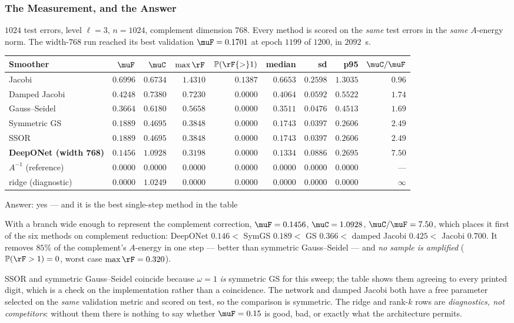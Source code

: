 \frametitle{The Measurement, and the Answer}
\footnotesize

$1024$ test errors, level $\ell=3$, $n=1024$, complement dimension $768$. Every method is
scored on the \emph{same} test errors in the \emph{same} $A$-energy norm. The width-$768$
run reached its best validation $\muF=0.1701$ at epoch $1199$ of $1200$, in $2092$~s.

\vspace{1mm}
\centering
{\scriptsize
\begin{tabular}{@{}lrrrrrrrr@{}}
\toprule
Smoother & $\muF$ & $\muC$ & $\max\rF$ & $\mathbb{P}(\rF{>}1)$ &
median & sd & p95 & $\muC/\muF$ \\
\midrule
Jacobi & $0.6996$ & $0.6734$ & $1.4310$ & $0.1387$ & $0.6653$ & $0.2598$ & $1.3035$ & $0.96$ \\
Damped Jacobi & $0.4248$ & $0.7380$ & $0.7230$ & $0.0000$ & $0.4064$ & $0.0592$ & $0.5522$ & $1.74$ \\
Gauss--Seidel & $0.3664$ & $0.6180$ & $0.5658$ & $0.0000$ & $0.3511$ & $0.0476$ & $0.4513$ & $1.69$ \\
Symmetric GS & $0.1889$ & $0.4695$ & $0.3848$ & $0.0000$ & $0.1743$ & $0.0397$ & $0.2606$ & $2.49$ \\
SSOR & $0.1889$ & $0.4695$ & $0.3848$ & $0.0000$ & $0.1743$ & $0.0397$ & $0.2606$ & $2.49$ \\
\textbf{DeepONet (width 768)} & \textbf{$0.1456$} & $1.0928$ & $0.3198$ & $0.0000$ &
$0.1334$ & $0.0886$ & $0.2695$ & \textbf{$7.50$} \\
$A^{-1}$ (reference) & $0.0000$ & $0.0000$ & $0.0000$ & $0.0000$ & $0.0000$ & $0.0000$ &
$0.0000$ & --- \\
ridge (diagnostic) & $0.0000$ & $1.0249$ & $0.0000$ & $0.0000$ & $0.0000$ & $0.0000$ &
$0.0000$ & $\infty$ \\
\bottomrule
\end{tabular}}

\vspace{1.5mm}
\begin{block}{Answer: yes --- and it is the best single-step method in the table}
\raggedright
With a branch wide enough to represent the complement correction,
$\muF=0.1456$, $\muC=1.0928$, $\muC/\muF=7.50$, which places it first of the six methods on
complement reduction:
DeepONet $0.146<$ SymGS $0.189<$ GS $0.366<$ damped Jacobi $0.425<$ Jacobi $0.700$. It
removes $85\%$ of the complement's $A$-energy in one step --- better than symmetric
Gauss--Seidel --- and \emph{no sample is amplified} ($\mathbb{P}(\rF>1)=0$, worst case
$\max\rF=0.320$).
\end{block}

\bre
SSOR and symmetric Gauss--Seidel coincide because $\omega=1$ \emph{is} symmetric GS for
this sweep; the table shows them agreeing to every printed digit, which is a check on the
implementation rather than a coincidence. The network and damped Jacobi both have a free
parameter selected on the \emph{same} validation metric and scored on test, so the
comparison is symmetric. The ridge and rank-$k$ rows are \emph{diagnostics, not
competitors}: without them there is nothing to say whether $\muF=0.15$ is good, bad, or
exactly what the architecture permits.
\ere
